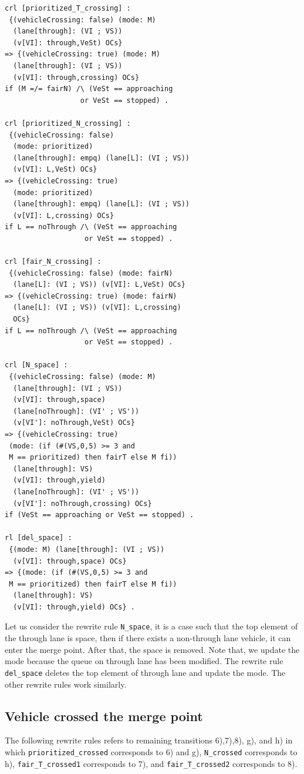 \documentclass[10pt, conference, compsocconf]{IEEEtran}
\begin{document}
\begin{small}
  \begin{verbatim}
crl [prioritized_T_crossing] : 
 {(vehicleCrossing: false) (mode: M) 
  (lane[through]: (VI ; VS)) 
  (v[VI]: through,VeSt) OCs} 
=> {(vehicleCrossing: true) (mode: M) 
  (lane[through]: (VI ; VS)) 
  (v[VI]: through,crossing) OCs} 
if (M =/= fairN) /\ (VeSt == approaching 
                  or VeSt == stopped) .

crl [prioritized_N_crossing] : 
 {(vehicleCrossing: false) 
  (mode: prioritized) 
  (lane[through]: empq) (lane[L]: (VI ; VS)) 
  (v[VI]: L,VeSt) OCs} 
=> {(vehicleCrossing: true) 
  (mode: prioritized) 
  (lane[through]: empq) (lane[L]: (VI ; VS)) 
  (v[VI]: L,crossing) OCs}
if L == noThrough /\ (VeSt == approaching 
                   or VeSt == stopped) .

crl [fair_N_crossing] : 
 {(vehicleCrossing: false) (mode: fairN) 
  (lane[L]: (VI ; VS)) (v[VI]: L,VeSt) OCs} 
=> {(vehicleCrossing: true) (mode: fairN) 
  (lane[L]: (VI ; VS)) (v[VI]: L,crossing) 
  OCs} 
if L == noThrough /\ (VeSt == approaching 
                   or VeSt == stopped) .

crl [N_space] : 
 {(vehicleCrossing: false) (mode: M)
  (lane[through]: (VI ; VS)) 
  (v[VI]: through,space) 
  (lane[noThrough]: (VI' ; VS')) 
  (v[VI']: noThrough,VeSt) OCs} 
=> {(vehicleCrossing: true) 
 (mode: (if (#(VS,0,5) >= 3 and 
 M == prioritized) then fairT else M fi))
  (lane[through]: VS) 
  (v[VI]: through,yield)
  (lane[noThrough]: (VI' ; VS')) 
  (v[VI']: noThrough,crossing) OCs}
if (VeSt == approaching or VeSt == stopped) .

rl [del_space] : 
 {(mode: M) (lane[through]: (VI ; VS)) 
  (v[VI]: through,space) OCs} 
=> {(mode: (if (#(VS,0,5) >= 3 and 
 M == prioritized) then fairT else M fi))
  (lane[through]: VS) 
  (v[VI]: through,yield) OCs} .
  \end{verbatim}
\end{small}

Let us consider the rewrite rule \verb!N_space!, it is a case such that
the top element of the through lane is space, then if there exists a 
non-through lane vehicle, it can enter the merge point. After that, 
the space is removed. Note that, we update the mode because the queue
on through lane has been modified. The rewrite rule \verb!del_space! deletes 
the top element of through lane and update the mode.
The other rewrite rules work similarly.

\subsection{Vehicle crossed the merge point}
The following rewrite rules refers to remaining transitions 6),7),8), g), and h) in which
\verb!prioritized_crossed! corresponds to 6) and g), \verb!N_crossed! corresponds to h),
\verb!fair_T_crossed1! corresponds to 7), and \verb!fair_T_crossed2! corresponds to 8).
\end{document}
